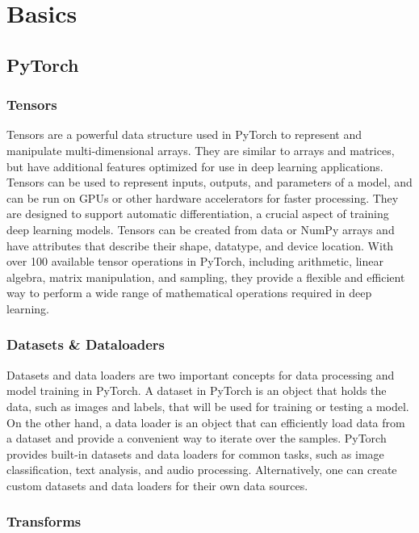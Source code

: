 \chapter{Basics}
\label{sec:basics}

\section{PyTorch}
\subsection{Tensors}

Tensors are a powerful data structure used in PyTorch to represent and manipulate multi-dimensional arrays.
They are similar to arrays and matrices, but have additional features optimized for use in deep learning applications.
Tensors can be used to represent inputs, outputs, and parameters of a model, and can be run on GPUs or other hardware accelerators for faster processing.
They are designed to support automatic differentiation, a crucial aspect of training deep learning models.
Tensors can be created from data or NumPy arrays and have attributes that describe their shape, datatype, and device location.
With over 100 available tensor operations in PyTorch, including arithmetic, linear algebra, matrix manipulation, and sampling, they provide a flexible and efficient way to perform a wide range of mathematical operations required in deep learning.


\subsection{Datasets \& Dataloaders}

Datasets and data loaders are two important concepts for data processing and model training in PyTorch.
A dataset in PyTorch is an object that holds the data, such as images and labels, that will be used for training or testing a model.
On the other hand, a data loader is an object that can efficiently load data from a dataset and provide a convenient way to iterate over the samples.
PyTorch provides built-in datasets and data loaders for common tasks, such as image classification, text analysis, and audio processing.
Alternatively, one can create custom datasets and data loaders for their own data sources.


\subsection{Transforms}

